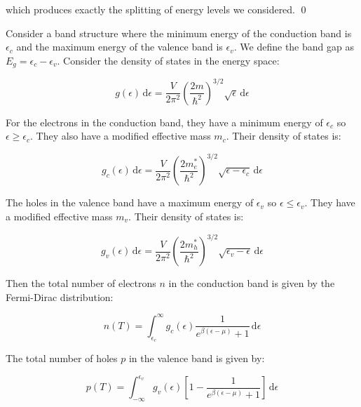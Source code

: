 \documentclass[12pt]{article}
\begin{document}
which produces exactly the splitting of energy levels we considered.
\qed




Consider a band structure where the minimum energy of the conduction band is $\epsilon_{c}$ and the maximum energy of the valence band is $\epsilon_{v}$. We define the band gap as $E_{g} = \epsilon_{c} - \epsilon_{v}$. Consider the density of states in the energy space:

\begin{equation}
    g(\epsilon) \, \mathrm{d}\epsilon = \frac{V}{2\pi^{2}} \left( \frac{2m}{\hbar^{2}} \right)^{3/2} \sqrt{\epsilon} \, \mathrm{d}\epsilon
\end{equation}

For the electrons in the conduction band, they have a minimum energy of $\epsilon_{c}$ so $\epsilon \geq \epsilon_{c}$. They also have a modified effective mass $m_{c}$. Their density of states is:

\begin{equation}
    g_{c}(\epsilon) \, \mathrm{d}\epsilon = \frac{V}{2\pi^{2}} \left( \frac{2m_{e}^{*}}{\hbar^{2}} \right)^{3/2} \sqrt{\epsilon - \epsilon_{c}} \, \mathrm{d}\epsilon
\end{equation}

The holes in the valence band have a maximum energy of $\epsilon_{v}$ so $\epsilon \leq \epsilon_{v}$. They have a modified effective mass $m_{v}$. Their density of states is:

\begin{equation}
    g_{v}(\epsilon) \, \mathrm{d}\epsilon = \frac{V}{2\pi^{2}} \left( \frac{2m_{h}^{*}}{\hbar^{2}} \right)^{3/2} \sqrt{\epsilon_{v} - \epsilon} \, \mathrm{d}\epsilon
\end{equation}

Then the total number of electrons $n$ in the conduction band is given by the Fermi-Dirac distribution:

\begin{equation}
    n(T) = \int_{\epsilon_{c}}^{\infty} g_{c}(\epsilon) \frac{1}{e^{\beta(\epsilon - \mu)} + 1} \, \mathrm{d}\epsilon
\end{equation}

The total number of holes $p$ in the valence band is given by:

\begin{equation}
    p(T) = \int_{-\infty}^{\epsilon_{v}} g_{v}(\epsilon) \left[ 1 - \frac{1}{e^{\beta(\epsilon - \mu)} + 1} \right] \, \mathrm{d}\epsilon
\end{equation}
\end{document}
